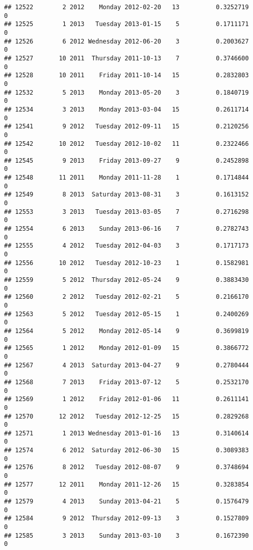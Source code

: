 \documentclass[
]{article}
\begin{document}
\begin{verbatim}
## 12522        2 2012    Monday 2012-02-20   13          0.3252719             0
## 12525        1 2013   Tuesday 2013-01-15    5          0.1711171             0
## 12526        6 2012 Wednesday 2012-06-20    3          0.2003627             0
## 12527       10 2011  Thursday 2011-10-13    7          0.3746600             0
## 12528       10 2011    Friday 2011-10-14   15          0.2832803             0
## 12532        5 2013    Monday 2013-05-20    3          0.1840719             0
## 12534        3 2013    Monday 2013-03-04   15          0.2611714             0
## 12541        9 2012   Tuesday 2012-09-11   15          0.2120256             0
## 12542       10 2012   Tuesday 2012-10-02   11          0.2322466             0
## 12545        9 2013    Friday 2013-09-27    9          0.2452898             0
## 12548       11 2011    Monday 2011-11-28    1          0.1714844             0
## 12549        8 2013  Saturday 2013-08-31    3          0.1613152             0
## 12553        3 2013   Tuesday 2013-03-05    7          0.2716298             0
## 12554        6 2013    Sunday 2013-06-16    7          0.2782743             0
## 12555        4 2012   Tuesday 2012-04-03    3          0.1717173             0
## 12556       10 2012   Tuesday 2012-10-23    1          0.1582981             0
## 12559        5 2012  Thursday 2012-05-24    9          0.3883430             0
## 12560        2 2012   Tuesday 2012-02-21    5          0.2166170             0
## 12563        5 2012   Tuesday 2012-05-15    1          0.2400269             0
## 12564        5 2012    Monday 2012-05-14    9          0.3699819             0
## 12565        1 2012    Monday 2012-01-09   15          0.3866772             0
## 12567        4 2013  Saturday 2013-04-27    9          0.2780444             0
## 12568        7 2013    Friday 2013-07-12    5          0.2532170             0
## 12569        1 2012    Friday 2012-01-06   11          0.2611141             0
## 12570       12 2012   Tuesday 2012-12-25   15          0.2829268             0
## 12571        1 2013 Wednesday 2013-01-16   13          0.3140614             0
## 12574        6 2012  Saturday 2012-06-30   15          0.3089383             0
## 12576        8 2012   Tuesday 2012-08-07    9          0.3748694             0
## 12577       12 2011    Monday 2011-12-26   15          0.3283854             0
## 12579        4 2013    Sunday 2013-04-21    5          0.1576479             0
## 12584        9 2012  Thursday 2012-09-13    3          0.1527809             0
## 12585        3 2013    Sunday 2013-03-10    3          0.1672390             0

\end{verbatim}
\end{document}
